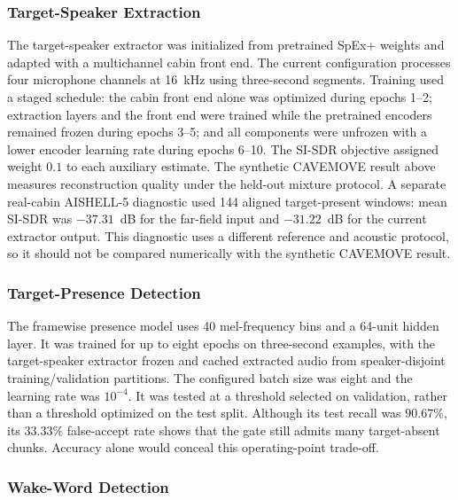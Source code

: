 \subsubsection{Target-Speaker Extraction}

The target-speaker extractor was initialized from pretrained SpEx+ weights and adapted with a multichannel cabin front end. The current configuration processes four microphone channels at 16~kHz using three-second segments. Training used a staged schedule: the cabin front end alone was optimized during epochs 1--2; extraction layers and the front end were trained while the pretrained encoders remained frozen during epochs 3--5; and all components were unfrozen with a lower encoder learning rate during epochs 6--10. The SI-SDR objective assigned weight $0.1$ to each auxiliary estimate. The synthetic CAVEMOVE result above measures reconstruction quality under the held-out mixture protocol. A separate real-cabin AISHELL-5 diagnostic used 144 aligned target-present windows: mean SI-SDR was $-37.31$~dB for the far-field input and $-31.22$~dB for the current extractor output. This diagnostic uses a different reference and acoustic protocol, so it should not be compared numerically with the synthetic CAVEMOVE result.

\subsubsection{Target-Presence Detection}

The framewise presence model uses 40 mel-frequency bins and a 64-unit hidden layer. It was trained for up to eight epochs on three-second examples, with the target-speaker extractor frozen and cached extracted audio from speaker-disjoint training/validation partitions. The configured batch size was eight and the learning rate was $10^{-4}$. It was tested at a threshold selected on validation, rather than a threshold optimized on the test split. Although its test recall was $90.67\%$, its $33.33\%$ false-accept rate shows that the gate still admits many target-absent chunks. Accuracy alone would conceal this operating-point trade-off.

\subsubsection{Wake-Word Detection}

